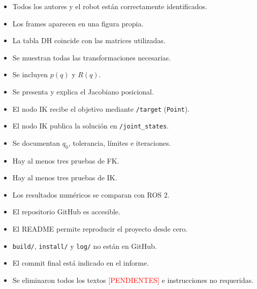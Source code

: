 \documentclass[journal]{IEEEtran}
\begin{document}
\begin{itemize}
    \item[$\square$] Todos los autores y el robot están correctamente identificados.
    \item[$\square$] Los frames aparecen en una figura propia.
    \item[$\square$] La tabla DH coincide con las matrices utilizadas.
    \item[$\square$] Se muestran todas las transformaciones necesarias.
    \item[$\square$] Se incluyen $p(q)$ y $R(q)$.
    \item[$\square$] Se presenta y explica el Jacobiano posicional.
    \item[$\square$] El nodo IK recibe el objetivo mediante \texttt{/target} (\texttt{Point}).
    \item[$\square$] El nodo IK publica la solución en \texttt{/joint\_states}.
    \item[$\square$] Se documentan $q_0$, tolerancia, límites e iteraciones.
    \item[$\square$] Hay al menos tres pruebas de FK.
    \item[$\square$] Hay al menos tres pruebas de IK.
    \item[$\square$] Los resultados numéricos se comparan con ROS 2.
    \item[$\square$] El repositorio GitHub es accesible.
    \item[$\square$] El README permite reproducir el proyecto desde cero.
    \item[$\square$] \texttt{build/}, \texttt{install/} y \texttt{log/} no están en GitHub.
    \item[$\square$] El commit final está indicado en el informe.
    \item[$\square$] Se eliminaron todos los textos \textcolor{red}{[PENDIENTES]} e instrucciones no requeridas.
\end{itemize}
\end{document}
